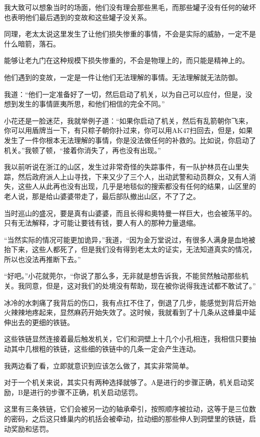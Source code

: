 我大致可以想象当时的场面，他们没有理会那些黑毛，而那些罐子没有任何的破坏也表明他们最后遇到的变故和这些罐子没关系。

同理，老太太说这里发生了让他们损失惨重的事情，不会是实际的威胁，一定不是什么暗箭，落石。

能够让老九门在这种规模下损失惨重的，不会是物理上的，而只能是精神上的。

他们遇到的变故，一定是一件让他们无法理解的事情。无法理解就无法防御。

我道：“他们一定准备好了一切，然后启动了机关，以为自己可以应付，但是，没想到发生的事情匪夷所思，和他们相信的完全不同。”

小花还是一脸迷茫，我就举例子道：“如果你启动了机关，然后有乱箭朝你飞来，你可以用盾牌当一下，有只粽子朝你扑过来，你可以用AK47扫回去，但是，如果发生了一件你根本无法理解的事情，你是没法做任何的补救的。比如说，你启动了机关。”我顿了顿，“接着你消失了，再也没有出现。”

我以前听说在浙江的山区，发生过非常奇怪的失踪事件，有一队护林员在山里失踪，然后政府派人上山寻找，下来又少了三个人，出动武警和动员群众，又有人消失，这些人从此再也没有出现，几乎是地毯似的搜索都没有任何的结果，山区里的老人说，那是给山婆婆带走了，最后部队撤出山区，不了了之。

当时巡山的盛况，要是真有山婆婆，而且长得和奧特曼一样巨大，也会被荡平的。只有无法解释，才可能让要钱有钱，要人有人的那种力量退缩。

“当然实际的情况可能更加诡异，”我道，“因为金万堂说过，有很多人满身是血地被抬下来，这些人都死了，但是我们没有得到老太太的证实，无法知道真实的情况，所以也没法再推断下去。”

“好吧。”小花就莞尔，“你说了那么多，无非就是想告诉我，不能贸然触动那些机关。我同意，但是，这对我们的处境没有帮助，现在被你说得我连试都不敢试了。”

冰冷的水刺痛了我背后的伤口，我有点扛不住了，倒退了几步，能感觉到背后开始火辣辣地疼起来，显然麻药开始失效了。这时候，我就看到了十几条从这蜂巢中延伸出去的更细的铁链。

这些铁链显然连接着最后触发机关，它们和洞壁上十几个小孔相连，我相信只要抽动其中几根粗的铁链，这些细的铁链中的几条一定会产生连动。

我两边看了看，立即就意识到应该怎么做了，其实非常简单。

对于一个机关来说，其实只有两种选择就够了。A是进行的步骤正确，机关启动奖励，B是进行的步骤不正确，机关启动惩罚。

这里有三条铁链，它们会被另一边的轴承牵引，按照顺序被拉动，这等于是三位数的密码，之后这只蜂巢内的机括会被牵动，拉动细的那些伸人到洞壁里的铁链，启动奖励和惩罚。

